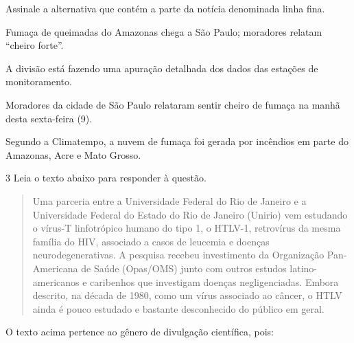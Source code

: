 
Assinale a alternativa que contém a parte da notícia denominada linha fina.

\begin{escolha}

\item Fumaça de queimadas do Amazonas chega a São Paulo; moradores relatam ``cheiro forte''.

\item A divisão está fazendo uma apuração detalhada dos dados das estações de monitoramento.

\item Moradores da cidade de São Paulo relataram sentir cheiro de fumaça na manhã desta sexta-feira (9).

\item Segundo a Climatempo, a nuvem de fumaça foi gerada por incêndios em parte do Amazonas, Acre e Mato Grosso.

\end{escolha}

\num{3} Leia o texto abaixo para responder à questão.

\begin{quote}
Uma parceria entre a Universidade Federal do Rio de Janeiro e a
Universidade Federal do Estado do Rio de Janeiro (Unirio) vem estudando
o vírus-T linfotrópico humano do tipo 1, o HTLV-1, retrovírus da mesma
família do HIV, associado a casos de leucemia e doenças
neurodegenerativas. A pesquisa recebeu investimento da Organização
Pan-Americana de Saúde (Opas/OMS) junto com outros estudos
latino-americanos e caribenhos que investigam doenças negligenciadas.
Embora descrito, na década de 1980, como um vírus associado ao câncer, o
HTLV ainda é pouco estudado e bastante desconhecido do público em geral.
\end{quote}


O texto acima pertence ao gênero de divulgação científica, pois:

